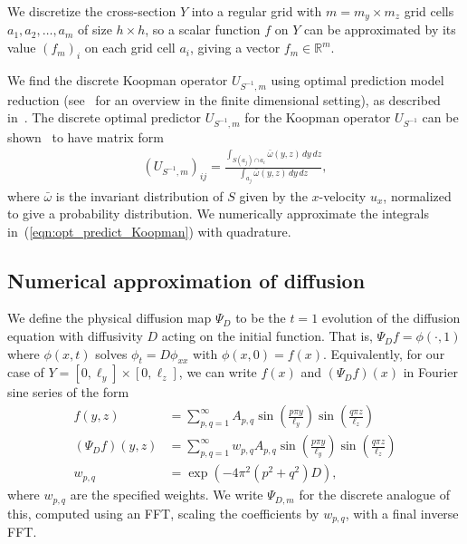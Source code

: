 \documentclass[times]{fldauth}
\begin{document}
We discretize the cross-section $Y$ into a regular grid with $m = m_y
\times m_z$ grid cells $a_1,a_2,\ldots,a_m$ of size $h \times h$, so a
scalar function $f$ on $Y$ can be approximated by its value $(f_m)_i$
on each grid cell $a_i$, giving a vector $f_m \in \mathbb{R}^m$.

We find the discrete Koopman operator $U_{S^{-1},m}$ using optimal
prediction model reduction \cite{ChorinHald2, ChorinHald1,
  mori1965tcm, zwanzig1980pnt, evans2008smn, Froyland2001,
  Froyland1999} (see~\cite{BeLaLiWe2009} for an overview in the finite
dimensional setting), as described in~\cite{numcutoff}. The discrete
optimal predictor $U_{S^{-1},m}$ for the Koopman operator $U_{S^{-1}}$
can be shown~\cite{numcutoff} to have matrix form
\begin{align}
  \label{eqn:opt_predict_Koopman}
  (U_{S^{-1},m})_{ij}
  = \frac{\displaystyle \int_{S(a_j) \cap a_i}
    \bar{\omega}(y,z)\,dy\,dz}{\displaystyle
    \int_{a_j} \bar{\omega}(y,z)\,dy\,dz},
\end{align}
where $\bar{\omega}$ is the invariant distribution of $S$ given by the
$x$-velocity $u_x$, normalized to give a probability
distribution. We numerically approximate the integrals
in~(\ref{eqn:opt_predict_Koopman}) with quadrature.

\subsection{Numerical approximation of diffusion}

We define the physical diffusion map $\Psi_D$ to be the $t=1$
evolution of the diffusion equation with diffusivity $D$ acting on the
initial function. That is, $\Psi_D f = \phi(\cdot,1)$ where
$\phi(x,t)$ solves $\phi_{t} = D \phi_{xx}$ with $\phi(x,0) =
f(x)$. Equivalently, for our case of $Y = [0,\ell_y] \times
[0,\ell_z]$, we can write $f(x)$ and $(\Psi_D f)(x)$ in Fourier sine
series of the form
\begin{align}
  f(y,z) &= \sum_{p,q=1}^\infty A_{p,q} \sin\left(\frac{p \pi
      y}{\ell_y}\right)
  \sin\left(\frac{q \pi z}{\ell_z}\right) \\
  (\Psi_D f)(y,z) &= \sum_{p,q=1}^\infty w_{p,q} A_{p,q}
  \sin\left(\frac{p \pi y}{\ell_y}\right)
    \sin\left(\frac{q \pi z}{\ell_z}\right) \\
    w_{p,q} &= \exp\left(-4\pi^2(p^2 + q^2) D\right),
\end{align}
where $w_{p,q}$ are the specified weights. We write $\Psi_{D,m}$ for
the discrete analogue of this, computed using an FFT, scaling the
coefficients by $w_{p,q}$, with a final inverse FFT.
\end{document}
